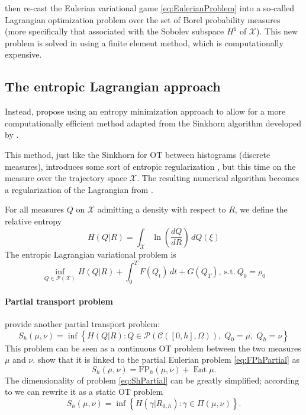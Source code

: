 \documentclass{article}
\newcommand{\calC}{\mathcal{C}}
\newcommand{\calP}{\mathcal{P}}
\newcommand{\calX}{\mathcal{X}}
\newcommand{\suchthat}{\mathrm{s.t.}}
\DeclareMathOperator{\Ent}{Ent}
\begin{document}
\textcite{benamou:hal-01295299,benamou2015lagrangian} then re-cast the Eulerian variational game \eqref{eq:EulerianProblem} into a so-called Lagrangian optimization problem over the set of Borel probability measures (more specifically that associated with the Sobolev subspace $H^1$ of $\calX$). This new problem is solved in \cite{benamou:hal-01295299} using a finite element method, which is computationally expensive.




\subsection{The entropic Lagrangian approach}

Instead, \textcite{benamou2018entropy} propose using an entropy minimization approach to allow for a more computationally efficient method adapted from the Sinkhorn algorithm \cite{cuturi2013sinkhorn} developed by \citeauthor{cuturi2013sinkhorn}.

This method, just like the Sinkhorn for OT between histograms (discrete measures), introduces some sort of entropic regularization \cite{benamou2018entropy}, but this time on the measure over the trajectory space $\calX$. The resulting numerical algorithm becomes a regularization of the Lagrangian from \cite{benamou:hal-01295299,benamou2015lagrangian}.

For all measures $Q$ on $\calX$ admitting a density with respect to $R$, we define the relative entropy
\begin{equation}\label{eq:VariationalEntropy}
  	H(Q | R) = \int_\calX \ln\left(\frac{dQ}{dR}\right)\,dQ(\xi)
\end{equation}
The entropic Lagrangian variational problem is
\begin{equation}\label{eq:EntropyLagrangianPb}
\inf_{Q\in\calP(\calX)}
H(Q|R) + \int_0^T F(Q_t)\,dt + G(Q_T),\
\suchthat\ Q_0 = \rho_0
\end{equation}

\paragraph{Partial transport problem} \citeauthor{benamou2018entropy} provide another partial transport problem:
\begin{equation}\label{eq:ShPartial}
   	S_h(\mu, \nu) =
   	\inf\left\{
   		H(Q|R) : Q\in\calP(\calC([0,h], \Omega)),
   		\; Q_0 = \mu,\; Q_h = \nu
   	\right\}
\end{equation}
This problem can be seen as a continuous OT problem between the two measures $\mu$ and $\nu$. \textcite{benamou2018entropy} show that it is linked to the partial Eulerian problem \eqref{eq:FPhPartial} as
\[
   	S_h(\mu,\nu) = \mathrm{FP}_h(\mu,\nu) + \Ent \mu.
\]
The dimensionality of problem \eqref{eq:ShPartial} can be greatly simplified; according to \cite{benamou2018entropy} we can rewrite it as a static OT problem
\begin{equation}
   	S_h(\mu, \nu) = \inf\left\{ H(\gamma | R_{0,h}) : \gamma \in \Pi(\mu, \nu) \right\}.
\end{equation}
\end{document}
